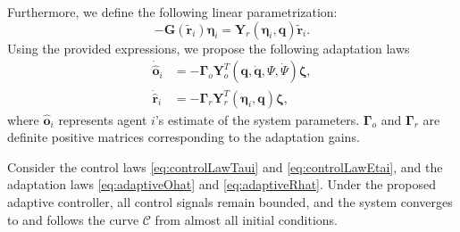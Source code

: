 Furthermore, we define the following linear parametrization:
\begin{equation}
    -\mathbf{G}(\widetilde{\mathbf{r}}_i)\boldsymbol{\eta}_i = \mathbf{Y}_r\left(\boldsymbol{\eta}_i, \mathbf{q}\right)\widetilde{\mathbf{r}}_i. \label{eq:linearParametrizationYrforEta}
\end{equation}
Using the provided expressions, we propose the following adaptation laws
\begin{align}
    \dot{\hat{\mathbf{o}}}_i &= -\boldsymbol{\Gamma}_o\mathbf{Y}^T_o\left(\mathbf{q},\dot{\mathbf{q}},\Psi, \dot{\Psi}\right)\boldsymbol{\zeta},  \label{eq:adaptiveOhat}\\
    \dot{\hat{\mathbf{r}}}_i &= -\boldsymbol{\Gamma}_r\mathbf{Y}^T_r\left(\boldsymbol{\eta}_i, \mathbf{q}\right)\boldsymbol{\zeta},  \label{eq:adaptiveRhat}
\end{align}
where $\hat{\mathbf{o}}_i$ represents agent $i$'s estimate of the system parameters. $\boldsymbol{\Gamma}_o$ and $\boldsymbol{\Gamma}_r$ are definite positive matrices corresponding to the adaptation gains.
\begin{theorem}
    Consider the control laws \eqref{eq:controlLawTaui} and \eqref{eq:controlLawEtai}, and the adaptation laws \eqref{eq:adaptiveOhat} and \eqref{eq:adaptiveRhat}. Under the proposed adaptive controller, all control signals remain bounded, and the system converges to and follows the curve $\mathcal{C}$ from almost all initial conditions.
\end{theorem}
